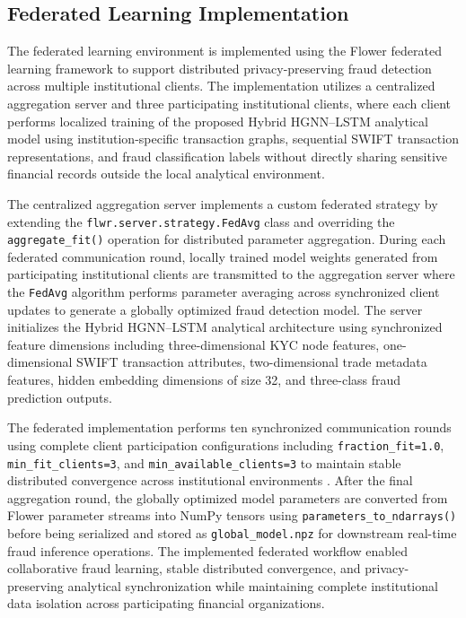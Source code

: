 \subsection[Federated Learning Implementation]{\textbf{Federated Learning Implementation}}

The federated learning environment is implemented using the Flower federated learning framework to support distributed privacy-preserving fraud detection across multiple institutional clients. The implementation utilizes a centralized aggregation server and three participating institutional clients, where each client performs localized training of the proposed Hybrid HGNN--LSTM analytical model using institution-specific transaction graphs, sequential SWIFT transaction representations, and fraud classification labels without directly sharing sensitive financial records outside the local analytical environment.

The centralized aggregation server implements a custom federated strategy by extending the \texttt{flwr.server.strategy.FedAvg} class and overriding the \texttt{aggregate\_fit()} operation for distributed parameter aggregation. During each federated communication round, locally trained model weights generated from participating institutional clients are transmitted to the aggregation server where the \texttt{FedAvg} algorithm performs parameter averaging across synchronized client updates to generate a globally optimized fraud detection model. The server initializes the Hybrid HGNN--LSTM analytical architecture using synchronized feature dimensions including three-dimensional KYC node features, one-dimensional SWIFT transaction attributes, two-dimensional trade metadata features, hidden embedding dimensions of size 32, and three-class fraud prediction outputs.

The federated implementation performs ten synchronized communication rounds using complete client participation configurations including \texttt{fraction\_fit=1.0}, \texttt{min\_fit\_clients=3}, and \texttt{min\_available\_clients=3} to maintain stable distributed convergence across institutional environments \cite{kennedy2025federated}. After the final aggregation round, the globally optimized model parameters are converted from Flower parameter streams into NumPy tensors using \texttt{parameters\_to\_ndarrays()} before being serialized and stored as \texttt{global\_model.npz} for downstream real-time fraud inference operations. The implemented federated workflow enabled collaborative fraud learning, stable distributed convergence, and privacy-preserving analytical synchronization while maintaining complete institutional data isolation across participating financial organizations.


